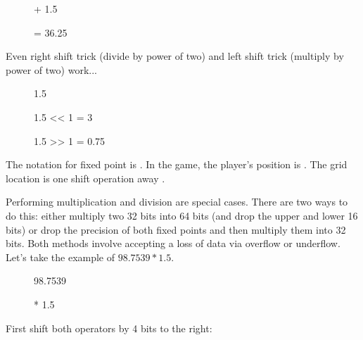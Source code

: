 \begin{figure}[H]
 \centering
   
  \caption{+ 1.5} 
\end{figure} 

\begin{figure}[H]
 \centering
   
  {\caption{= 36.25}}
\end{figure} 
\par
 Even right shift trick (divide by power of two) and left shift trick (multiply by power of two) work...\\
 
 \par
\begin{figure}[H]
 \centering
   
   \caption{1.5} 
\end{figure} 

\par
\begin{figure}[H]
 \centering
   
   \caption{1.5 << 1  = 3} 
\end{figure}

\par
\begin{figure}[H]
 \centering
   
   \caption{1.5 >> 1 = 0.75} 
\end{figure}

The notation for fixed point is . In the game, the player's position is . The grid location is one shift operation away .\\
\par
Performing multiplication and division are special cases. There are two ways to do this: either multiply two 32 bits into 64 bits (and drop the upper and lower 16 bits) or drop the precision of both fixed points and then multiply them into 32 bits. Both methods involve accepting a loss of data via overflow or underflow. Let's take the example of $98.7539 * 1.5$.


\par
\begin{figure}[H]
 \centering
   
   \caption{98.7539} 
\end{figure} 
\par
\begin{figure}[H]
 \centering
   
   \caption{* 1.5} 
\end{figure} 
\par
First shift both operators by 4 bits to the right:\\
\par
\begin{figure}[H]
 \centering
   
\end{figure} 
\par
\begin{figure}[H]
 \centering
   
\end{figure} 
\par

